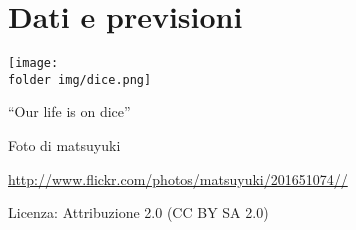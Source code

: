 \part{Dati e previsioni}
\texttt{[image: \\folder img/dice.png]}
 \begin{center}
 {\large ``Our life is on dice''}
 \par
 Foto di matsuyuki
 \par
 \url{http://www.flickr.com/photos/matsuyuki/201651074//}\par
 Licenza: Attribuzione 2.0 (CC BY SA 2.0)\par
 \end{center}
\clearpage
\cleardoublepage
